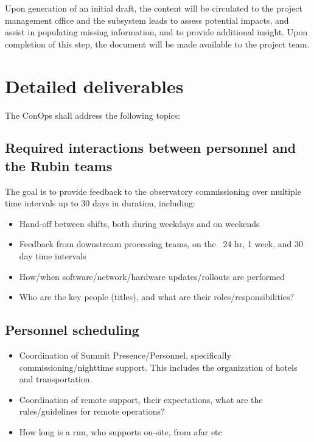 \documentclass[SE,authoryear,toc]{lsstdoc}
\begin{document}
Upon generation of an initial draft, the content will be circulated to the project management office and the subsystem leads to assess potential impacts, and assist in populating missing information, and to provide additional insight. 
Upon completion of this step, the document will be made available to the project team. 

\section{Detailed deliverables}
The ConOps shall address the following topics:

\subsection{Required interactions between personnel and the Rubin teams}
The goal is to provide feedback to the observatory commissioning over multiple time intervals up to 30 days in duration, including:
\begin{itemize}
\item Hand-off between shifts, both during weekdays and on weekends
\item Feedback from downstream processing teams, on the ~24 hr, 1 week, and 30 day time intervals
\item How/when software/network/hardware updates/rollouts are performed
\item Who are the key people (titles), and what are their roles/responsibilities?
\end{itemize}

\subsection{Personnel scheduling}
\begin{itemize}
\item Coordination of Summit Presence/Personnel, specifically commissioning/nighttime support. 
      This includes the organization of hotels and transportation.
\item Coordination of remote support, their expectations, what are the rules/guidelines for remote operations?
\item How long is a run, who supports on-site, from afar etc
\end{itemize}
\end{document}
